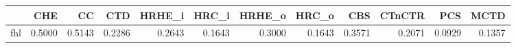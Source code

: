 \begin{tabular}{lrrrrrrrrrrr}
\toprule
 & CHE & CC & CTD & HRHE_i & HRC_i & HRHE_o & HRC_o & CBS & CTnCTR & PCS & MCTD \\
\midrule
fhl & 0.5000 & 0.5143 & 0.2286 & 0.2643 & 0.1643 & 0.3000 & 0.1643 & 0.3571 & 0.2071 & 0.0929 & 0.1357 \\
\bottomrule
\end{tabular}
